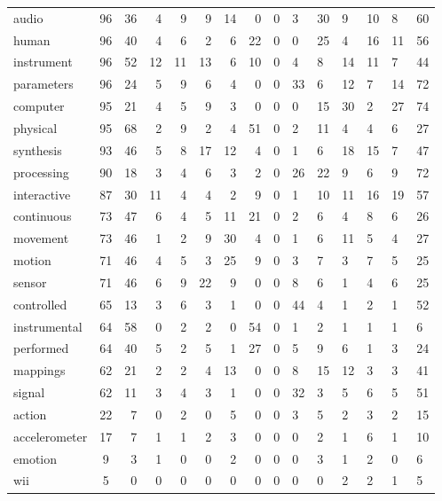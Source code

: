 \begin{table*}[htbp]
\begin{small}
\begin{tabular}{lcrrrrrrcllllll}
audio & 96 & 36 & 4 & 9 & 9 & 14 & 0 & 0 & 3 & 30 & 9 & 10 & 8 & 60 \\
human & 96 & 40 & 4 & 6 & 2 & 6 & 22 & 0 & 0 & 25 & 4 & 16 & 11 & 56 \\
instrument & 96 & 52 & 12 & 11 & 13 & 6 & 10 & 0 & 4 & 8 & 14 & 11 & 7 & 44 \\
parameters & 96 & 24 & 5 & 9 & 6 & 4 & 0 & 0 & 33 & 6 & 12 & 7 & 14 & 72 \\
computer & 95 & 21 & 4 & 5 & 9 & 3 & 0 & 0 & 0 & 15 & 30 & 2 & 27 & 74 \\
physical & 95 & 68 & 2 & 9 & 2 & 4 & 51 & 0 & 2 & 11 & 4 & 4 & 6 & 27 \\
synthesis & 93 & 46 & 5 & 8 & 17 & 12 & 4 & 0 & 1 & 6 & 18 & 15 & 7 & 47 \\
processing & 90 & 18 & 3 & 4 & 6 & 3 & 2 & 0 & 26 & 22 & 9 & 6 & 9 & 72 \\
interactive & 87 & 30 & 11 & 4 & 4 & 2 & 9 & 0 & 1 & 10 & 11 & 16 & 19 & 57 \\
continuous & 73 & 47 & 6 & 4 & 5 & 11 & 21 & 0 & 2 & 6 & 4 & 8 & 6 & 26 \\
movement & 73 & 46 & 1 & 2 & 9 & 30 & 4 & 0 & 1 & 6 & 11 & 5 & 4 & 27 \\
motion & 71 & 46 & 4 & 5 & 3 & 25 & 9 & 0 & 3 & 7 & 3 & 7 & 5 & 25 \\
sensor & 71 & 46 & 6 & 9 & 22 & 9 & 0 & 0 & 8 & 6 & 1 & 4 & 6 & 25 \\
controlled & 65 & 13 & 3 & 6 & 3 & 1 & 0 & 0 & 44 & 4 & 1 & 2 & 1 & 52 \\
instrumental & 64 & 58 & 0 & 2 & 2 & 0 & 54 & 0 & 1 & 2 & 1 & 1 & 1 & 6 \\
performed & 64 & 40 & 5 & 2 & 5 & 1 & 27 & 0 & 5 & 9 & 6 & 1 & 3 & 24 \\
mappings & 62 & 21 & 2 & 2 & 4 & 13 & 0 & 0 & 8 & 15 & 12 & 3 & 3 & 41 \\
signal & 62 & 11 & 3 & 4 & 3 & 1 & 0 & 0 & 32 & 3 & 5 & 6 & 5 & 51 \\
action & 22 & 7 & 0 & 2 & 0 & 5 & 0 & 0 & 3 & 5 & 2 & 3 & 2 & 15 \\
accelerometer & 17 & 7 & 1 & 1 & 2 & 3 & 0 & 0 & 0 & 2 & 1 & 6 & 1 & 10 \\
emotion & 9 & 3 & 1 & 0 & 0 & 2 & 0 & 0 & 0 & 3 & 1 & 2 & 0 & 6 \\
wii & 5 & 0 & 0 & 0 & 0 & 0 & 0 & 0 & 0 & 0 & 2 & 2 & 1 & 5 \\ 
\midrule
\end{tabular}
\end{small}
\label{Jensenius:tab:collocation}
\end{table*}



